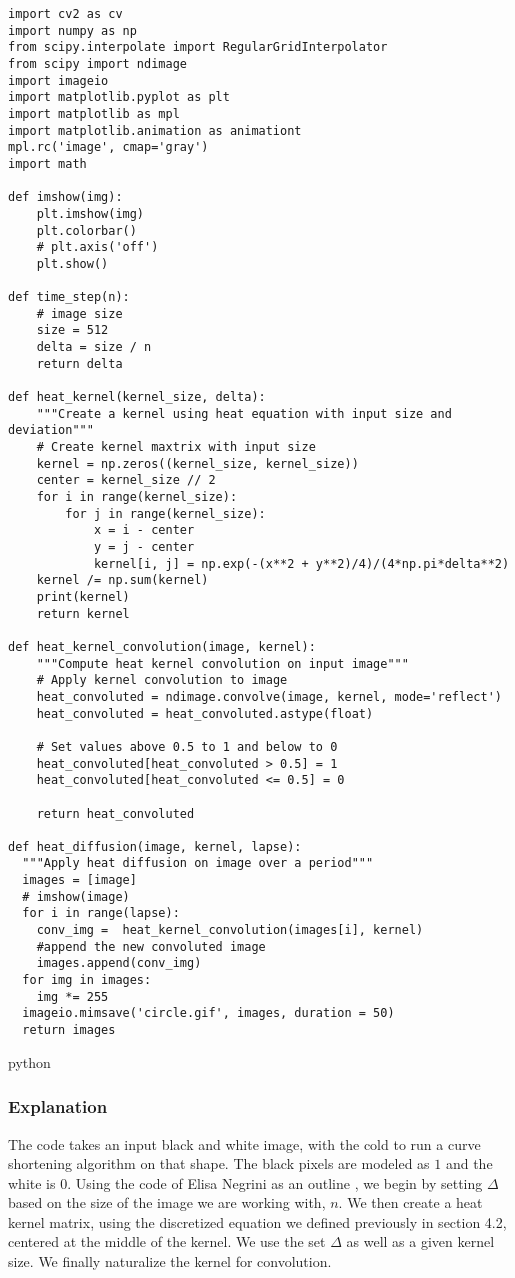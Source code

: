 \documentclass[12pt]{article}
\theoremstyle{plain}
\theoremstyle{definition}
\theoremstyle{remark}
\begin{document}
\begin{verbatim}
import cv2 as cv
import numpy as np
from scipy.interpolate import RegularGridInterpolator
from scipy import ndimage
import imageio
import matplotlib.pyplot as plt
import matplotlib as mpl
import matplotlib.animation as animationt
mpl.rc('image', cmap='gray')
import math

def imshow(img):
    plt.imshow(img)
    plt.colorbar()
    # plt.axis('off')
    plt.show()

def time_step(n):
    # image size
    size = 512
    delta = size / n
    return delta

def heat_kernel(kernel_size, delta):
    """Create a kernel using heat equation with input size and deviation"""
    # Create kernel maxtrix with input size
    kernel = np.zeros((kernel_size, kernel_size))
    center = kernel_size // 2
    for i in range(kernel_size):
        for j in range(kernel_size):
            x = i - center
            y = j - center
            kernel[i, j] = np.exp(-(x**2 + y**2)/4)/(4*np.pi*delta**2)
    kernel /= np.sum(kernel)
    print(kernel)
    return kernel

def heat_kernel_convolution(image, kernel):
    """Compute heat kernel convolution on input image"""
    # Apply kernel convolution to image
    heat_convoluted = ndimage.convolve(image, kernel, mode='reflect')
    heat_convoluted = heat_convoluted.astype(float)

    # Set values above 0.5 to 1 and below to 0
    heat_convoluted[heat_convoluted > 0.5] = 1
    heat_convoluted[heat_convoluted <= 0.5] = 0

    return heat_convoluted

def heat_diffusion(image, kernel, lapse):
  """Apply heat diffusion on image over a period"""
  images = [image]
  # imshow(image)
  for i in range(lapse):
    conv_img =  heat_kernel_convolution(images[i], kernel)
    #append the new convoluted image 
    images.append(conv_img)
  for img in images:
    img *= 255
  imageio.mimsave('circle.gif', images, duration = 50)
  return images
\end{verbatim}{python}
\subsubsection{Explanation}
The code takes an input black and white image, with the cold to run a curve shortening algorithm on that shape. The black pixels are modeled as $1$ and the white is $0$. Using the code of Elisa Negrini as an outline \cite{elisia}, 
we begin by setting $\Delta$ based on the size of the image we are working with, $n$. We then create a heat kernel matrix, using the discretized equation we defined previously in section 4.2, centered at the middle of the kernel. We use the set $\Delta$ as well as a given kernel size. We finally naturalize the kernel for convolution. 
\end{document}
